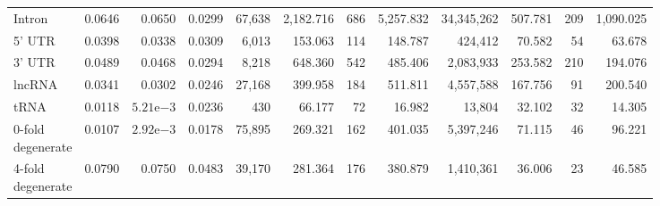 \documentclass[11pt]{article}
\begin{document}
\begin{table}
\begin{tabular}{lrrrrrrrrrrr}
        Intron                             & 0.0646 & 0.0650               & 0.0299 & 67,638 & 2,182.716 & 686    & 5,257.832 & 34,345,262 & 507.781   & 209    & 1,090.025 \\
        5' UTR                             & 0.0398 & 0.0338               & 0.0309 & 6,013  & 153.063   & 114    & 148.787   & 424,412    & 70.582    & 54     & 63.678    \\
        3' UTR                             & 0.0489 & 0.0468               & 0.0294 & 8,218  & 648.360   & 542    & 485.406   & 2,083,933  & 253.582   & 210    & 194.076   \\
        lncRNA                             & 0.0341 & 0.0302               & 0.0246 & 27,168 & 399.958   & 184    & 511.811   & 4,557,588  & 167.756   & 91     & 200.540   \\
        tRNA                               & 0.0118 & $5.21\mathrm{e}{-3}$ & 0.0236 & 430    & 66.177    & 72     & 16.982    & 13,804     & 32.102    & 32     & 14.305    \\
        \shortstack[l]{0-fold\\degenerate} & 0.0107 & $2.92\mathrm{e}{-3}$ & 0.0178 & 75,895 & 269.321   & 162    & 401.035   & 5,397,246  & 71.115    & 46     & 96.221    \\
        \shortstack[l]{4-fold\\degenerate} & 0.0790 & 0.0750               & 0.0483 & 39,170 & 281.364   & 176    & 380.879   & 1,410,361  & 36.006    & 23     & 46.585    \\
    \bottomrule
    \end{tabular}
\end{table}
\end{document}
